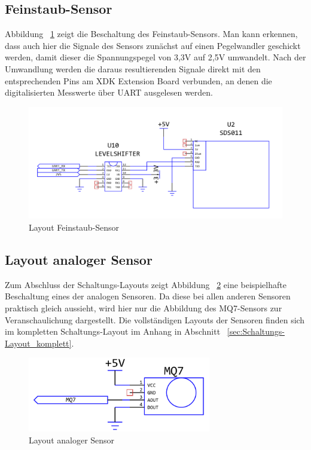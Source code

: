 \subsection{Feinstaub-Sensor}\label{subsec:Feinstaub-Sensor}
Abbildung ~\ref{fig:Layout_SDS011} zeigt die Beschaltung des Feinstaub-Sensors. Man kann erkennen, dass auch hier die Signale des Sensors zunächst auf einen Pegelwandler geschickt werden, damit dieser die Spannungspegel von 3,3V auf 2,5V umwandelt. Nach der Umwandlung werden die daraus resultierenden Signale direkt mit den entsprechenden Pins am \acs{XDK} Extension Board verbunden, an denen die digitalisierten Messwerte über \acs{UART} ausgelesen werden.
\begin{figure}[H]
	\includegraphics[width=\textwidth]{images/Layout_SDS011.png}	
	\caption{Layout Feinstaub-Sensor}
	\label{fig:Layout_SDS011}
\end{figure}
\subsection{Layout analoger Sensor}\label{subsec:Layout analoger Sensor}
Zum Abschluss der Schaltungs-Layouts zeigt Abbildung ~\ref{fig:Layout_Sensor_Example} eine beispielhafte Beschaltung eines der analogen Sensoren. Da diese bei allen anderen Sensoren praktisch gleich aussieht, wird hier nur die Abbildung des MQ7-Sensors zur Veranschaulichung dargestellt. Die vollständigen Layouts der Sensoren finden sich im kompletten Schaltungs-Layout im Anhang in Abschnitt ~\ref{sec:Schaltungs-Layout_komplett}.
\begin{figure}[H]
	\includegraphics[width=8cm]{images/Layout_Sensor_Example.png}	
	\caption{Layout analoger Sensor}
	\label{fig:Layout_Sensor_Example}
\end{figure}